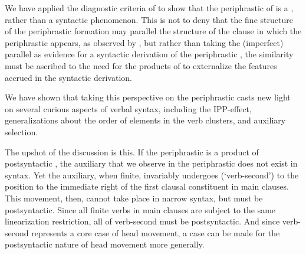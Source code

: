 \documentclass[output=paper]{LSP/langsci}
\begin{document}
  We have applied the diagnostic criteria of \citet{BrownEtAl2012} to show that the periphrastic  of  is a , rather than a syntactic phenomenon. This is not to deny that the fine structure of the periphrastic  formation may parallel the structure of the clause in which the periphrastic  appears, as observed by \citet{Embick2000}, but rather than taking the (imperfect) parallel as evidence for a syntactic derivation of the periphrastic , the similarity must be ascribed to the need for the products of  to externalize the features accrued in the syntactic derivation.

  We have shown that taking this perspective on the periphrastic  casts new light on several curious aspects of  verbal syntax, including the IPP-effect, generalizations about the order of elements in the verb clusters, and auxiliary selection.

  The upshot of the discussion is this. If the periphrastic  is a product of postsyntactic , the auxiliary that we observe in the periphrastic  does not exist in syntax. Yet the auxiliary, when finite, invariably undergoes  (‘verb-second’) to the position to the immediate right of the first clausal constituent in  main clauses. This movement, then, cannot take place in narrow syntax, but must be postsyntactic. Since all finite verbs in main clauses are subject to the same linearization restriction, all of verb-second must be postsyntactic. And since verb-second represents a core case of head movement, a case can be made for the postsyntactic nature of head movement more generally.
 
  

\printbibliography[heading=subbibliography,notkeyword=this]
\end{document}
